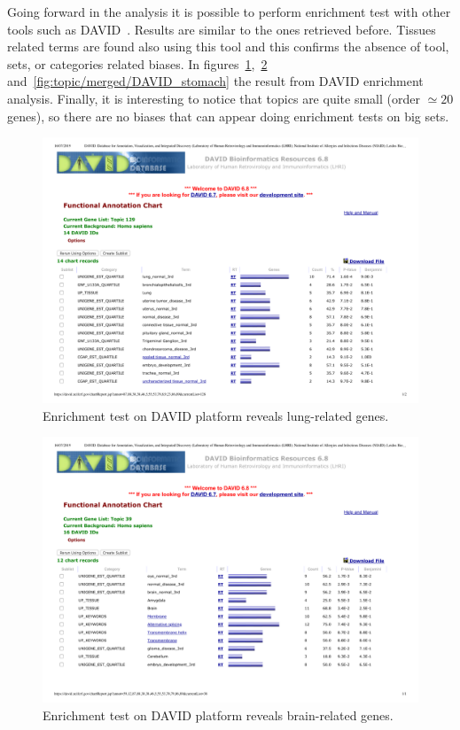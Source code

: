 Going forward in the analysis it is possible to perform enrichment test with other tools such as DAVID~\cite{huang2008bioinformatics,huang2009systematic}. Results are similar to the ones retrieved before. Tissues related terms are found also using this tool and this confirms the absence of tool, sets, or categories related biases. In figures~\ref{fig:topic/merged/DAVID_lung},~\ref{fig:topic/merged/DAVID_brain} and~\ref{fig:topic/merged/DAVID_stomach} the result from DAVID enrichment analysis. Finally, it is interesting to notice that topics are quite small (order $\simeq20$ genes), so there are no biases that can appear doing enrichment tests on big sets.
\begin{figure}[htb!]
    \centering
    \includegraphics[width=0.8\linewidth]{pictures/topic/merged/DAVID_lung.pdf}
    \caption{Enrichment test on DAVID platform reveals lung-related genes.}
    \label{fig:topic/merged/DAVID_lung}
\end{figure}
\begin{figure}[htb!]
    \centering
    \includegraphics[width=0.8\linewidth]{pictures/topic/merged/DAVID_brain.pdf}
    \caption{Enrichment test on DAVID platform reveals brain-related genes.}
    \label{fig:topic/merged/DAVID_brain}
\end{figure}
